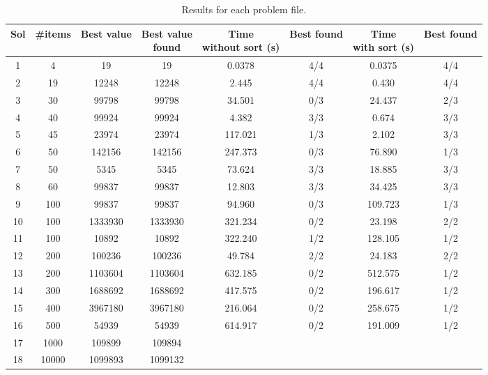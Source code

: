 \documentclass[anon]{CI}
\begin{document}
\begin{table}[!htbp]
\centering
\begin{adjustbox}{max width=\textwidth}
\begin{tabular}{|c|c|c|c|c|c|c|c|}
\hline 
Sol & \#items & Best value & \makecell{Best value\\found} & \makecell{Time\\without sort (s)} & Best found & \makecell{Time\\with sort (s)} & Best found\\
\hline 
1 & 4 & 19  & 19  & 0.0378 & 4/4 & 0.0375 & 4/4\\
\hline 
2 & 19 & 12248 & 12248 & 2.445 & 4/4 & 0.430 & 4/4\\
\hline 
3 & 30 & 99798  & 99798  & 34.501 & 0/3 & 24.437 & 2/3\\
\hline 
4 & 40 & 99924  & 99924  & 4.382 & 3/3 & 0.674 & 3/3\\
\hline 
5 & 45 & 23974  & 23974  & 117.021 & 1/3 & 2.102 & 3/3\\
\hline 
6 & 50 & 142156  & 142156  & 247.373 & 0/3 & 76.890 & 1/3\\
\hline 
7 & 50 & 5345  & 5345  & 73.624 & 3/3 & 18.885 & 3/3\\
\hline 
8 & 60 & 99837  & 99837  & 12.803 & 3/3 & 34.425 & 3/3\\
\hline 
9 & 100 & 99837  & 99837  & 94.960 & 0/3 & 109.723 & 1/3\\
\hline 
10 & 100 & 1333930  & 1333930  & 321.234 & 0/2 & 23.198 & 2/2\\
\hline 
11 & 100 & 10892  & 10892  & 322.240 & 1/2 & 128.105 & 1/2\\
\hline 
12 & 200 & 100236  & 100236  & 49.784 & 2/2 & 24.183 & 2/2\\
\hline 
13 & 200 & 1103604  & 1103604  & 632.185 & 0/2 & 512.575 & 1/2\\
\hline 
14 & 300 & 1688692  & 1688692  & 417.575 & 0/2 & 196.617 & 1/2\\
\hline 
15 & 400 & 3967180  & 3967180  & 216.064 & 0/2 & 258.675 & 1/2\\
\hline 
16 & 500 & 54939  & 54939  & 614.917 & 0/2 & 191.009 & 1/2\\
\hline 
17 & 1000 & 109899 & 109894 &  &  &  & \\
\hline 
18 & 10000 & 1099893 & 1099132 &  &  &  & \\
\hline 
\end{tabular}
\par\end{adjustbox}
\caption{Results for each problem file.}
\label{tab:results}

\end{table}
\end{document}
